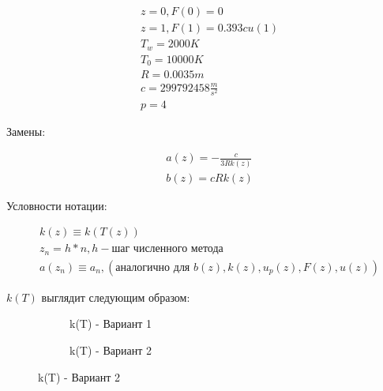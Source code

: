 \documentclass[a4paper,12pt]{article}
\begin{document}
    \Large
    \begin{equation}
        \begin{aligned}
            &z=0,F(0)=0\\
            &z=1,F(1)=0.393cu(1)\\
            &T_{w}=2000K\\
            &T_{0}=10000K\\
            &R=0.0035m\\
            &c=299792458\frac{m}{s^2}\\
            &p=4
        \end{aligned}
    \end{equation}
    \normalsize

    \vspace{1cm}
    Замены:

    \Large
    \begin{equation}
        \begin{aligned}
            &a(z)=-\frac{c}{3Rk(z)}\\
            &b(z)=cRk(z)
        \end{aligned}
    \end{equation}
    \normalsize

    \vspace{1cm}
    Условности нотации:

    \Large
    \begin{equation}
        \begin{aligned}
            &k(z)\equiv k(T(z))\\
            &z_n = h * n , h - \text{шаг численного метода}\\
            &a(z_n) \equiv a_n, (\text{аналогично для } b(z), k(z), u_p(z), F(z), u(z))
        \end{aligned}
    \end{equation}
    \normalsize
    

    \newpage
    $k(T)$ выглядит следующим образом:


    \begin{figure}[H]
        \centering
        \begin{subfigure}{.5\textwidth}
          \centering
          \resizebox{\textwidth}{!}{}
          \caption{k(T) - Вариант 1}
          \label{fig:sub1}
        \end{subfigure}%
        \begin{subfigure}{.5\textwidth}
          \centering
          \resizebox{\textwidth}{!}{}
          \caption{k(T) - Вариант 2}
          \label{fig:sub2}
        \end{subfigure}
        \label{fig:test}
    \end{figure}
\end{document}
